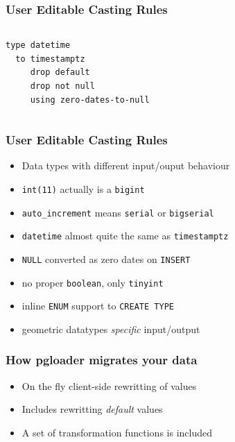 \documentclass{beamer}
\begin{document}
\begin{frame}[fragile]
  \frametitle{User Editable Casting Rules}
  
  \vfill

\begin{columns}[c]
\begin{verbatim}
type datetime
  to timestamptz
     drop default
     drop not null
     using zero-dates-to-null
\end{verbatim}
\end{columns}
\end{frame}

\begin{frame}[fragile]
  \frametitle{User Editable Casting Rules}
  
  \vfill

  \begin{itemize}
  \item Data types with different input/ouput behaviour
  \item \texttt{int(11)} actually is a \texttt{bigint}
  \item \texttt{auto\_increment} means \texttt{serial} or \texttt{bigserial}
  \item \texttt{datetime} almost quite the same as \texttt{timestamptz}
  \item \texttt{NULL} converted as zero dates on \texttt{INSERT}
  \item no proper \texttt{boolean}, only \texttt{tinyint}
  \item inline \texttt{ENUM} support to \texttt{CREATE TYPE}
  \item geometric datatypes \textit{specific} input/output
  \end{itemize}
\end{frame}

\begin{frame}[fragile]
  \frametitle{How pgloader migrates your data}
  
  \vfill

  \begin{itemize}
  \item On the fly client-side rewritting of values
  \item Includes rewritting \textit{default} values
  \item A set of transformation functions is included
  \end{itemize}
\end{frame}
\end{document}
